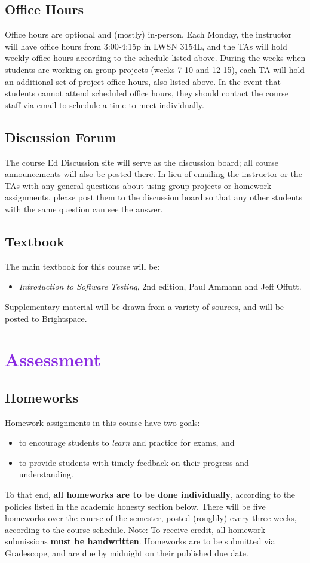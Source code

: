 \documentclass[letterpaper,11pt]{article}
\begin{document}
\subsection*{Office Hours}

Office hours are optional and (mostly) in-person. Each Monday, the
instructor will have office hours from 3:00-4:15p in LWSN 3154L, and
the TAs will hold weekly office hours according to the schedule listed
above. During the weeks when students are working on group projects
(weeks 7-10 and 12-15), each TA will hold an additional set of project
office hours, also listed above.  In the event that students cannot
attend scheduled office hours, they should contact the course staff
via email to schedule a time to meet individually.

\subsection*{Discussion Forum}

The course Ed Discussion site will serve as the discussion board; all
course announcements will also be posted there. In lieu of emailing
the instructor or the TAs with any general questions about using group
projects or homework assignments, please post them to the discussion
board so that any other students with the same question can see the
answer.

\subsection*{Textbook}

The main textbook for this course will be:
\begin{itemize}
\item \textit{Introduction to Software Testing}, 2nd edition, Paul
  Ammann and Jeff Offutt.
\end{itemize}
Supplementary material will be drawn from a variety of sources, and
will be posted to Brightspace.

\section*{\textcolor{BlueViolet}{Assessment}}

\subsection*{Homeworks}
Homework assignments in this course have two goals:
\begin{itemize}
\item to encourage students to \emph{learn} and practice for exams, and
\item to provide students with timely feedback on their progress and
  understanding.
\end{itemize}
To that end, \textbf{all homeworks are to be done individually},
according to the policies listed in the academic honesty section
below. There will be five homeworks over the course of the semester,
posted (roughly) every three weeks, according to the course
schedule. Note: To receive credit, all homework submissions
\textbf{must be handwritten}. Homeworks are to be submitted via
Gradescope, and are due by midnight on their published due date.
\end{document}
